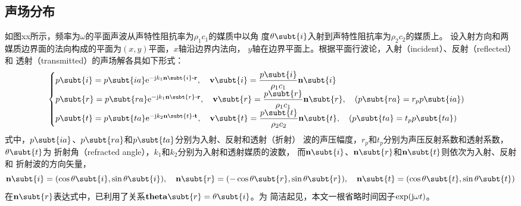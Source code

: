 \documentclass[UTF8]{ctexbook}
\begin{document}
\subsection{声场分布}
如图xx所示，频率为$\omega$的平面声波从声特性阻抗率为$\rho_1c_1$的媒质中以角
度$\theta\subt{i}$入射到声特性阻抗率为$\rho_2c_2$的媒质上。
设入射方向和两媒质边界面的法向构成的平面为$(x,y)$平面，$x$轴沿边界内法向，
$y$轴在边界平面上。根据平面行波论，入射（incident）、反射（reflected）和
透射（transmitted）的声场解各具如下形式：
\begin{equation}
	\label{eq:totalref_pressure}
	\begin{cases}
	p\subt{i} = p\subt{ia} \me^{-\mj k_1 \vb{n}\subt{i} \vdot \vb{r}}
	\qc \vb{v}\subt{i} = \dfrac{p\subt{i}}{\rho_1c_1} \vb{n}\subt{i}\\
	p\subt{r} = p\subt{ra} \me^{-\mj k_1 \vb{n}\subt{r} \vdot \vb{r}}
	\qc \vb{v}\subt{r} = \dfrac{p\subt{r}}{\rho_1c_1} \vb{n}\subt{r}
	\qc (p\subt{ra} = r_p p\subt{ia}) \\
	p\subt{t} = p\subt{ta} \me^{-\mj k_2 \vb{n}\subt{t} \vdot \vb{t}}
	\qc \vb{v}\subt{t} = \dfrac{p\subt{t}}{\rho_2c_2} \vb{n}\subt{t}
	\qc (p\subt{ta} = t_p p\subt{ta}) 
	\end{cases}
\end{equation}
式中，$p\subt{ia}$、$p\subt{ra}$和$p\subt{ta}$分别为入射、反射和透射（折射）
波的声压幅度，$r_p$和$t_p$分别为声压反射系数和透射系数，$\theta\subt{t}$为
折射角（refracted angle），$k_1$和$k_2$分别为入射和透射媒质的波数，
而$\vb{n}\subt{i}$、$\vb{n}\subt{r}$和$\vb{n}\subt{t}$则依次为入射、反射和
折射波的方向矢量，
\begin{equation}
	\label{eq:totalref_n}
	\vb{n}\subt{i}=(\cos \theta\subt{i}, \sin \theta\subt{i})\qc 
	\vb{n}\subt{r}=(-\cos \theta\subt{r}, \sin \theta\subt{r})\qc 
	\vb{n}\subt{t}=(\cos \theta\subt{t}, \sin \theta\subt{t})
\end{equation}
在$\vb{n}\subt{r}$表达式中，已利用了关系$\vb{theta}\subt{r}=\theta\subt{i}$。为
简洁起见，本文一根省略时间因子$\exp(\mathrm{j} \omega t)$。
\end{document}
